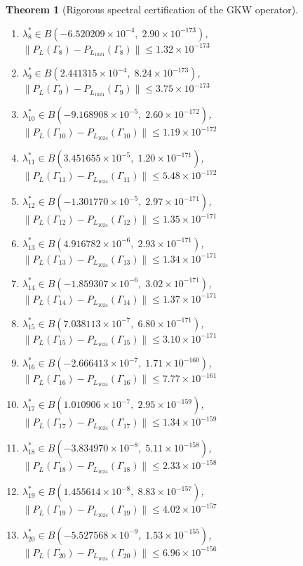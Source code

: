 \documentclass[11pt]{article}
\newtheorem{theorem}{Theorem}
\begin{document}
\begin{theorem}[Rigorous spectral certification of the GKW operator]
\begin{enumerate}
\item $\lambda_{8}^* \in B(-6.520209 \times 10^{-4},\; 2.90 \times 10^{-173})$, \quad $\|P_L(\Gamma_{8}) - P_{L_{1024}}(\Gamma_{8})\| \leq 1.32 \times 10^{-173}$
\item $\lambda_{9}^* \in B(2.441315 \times 10^{-4},\; 8.24 \times 10^{-173})$, \quad $\|P_L(\Gamma_{9}) - P_{L_{1024}}(\Gamma_{9})\| \leq 3.75 \times 10^{-173}$
\item $\lambda_{10}^* \in B(-9.168908 \times 10^{-5},\; 2.60 \times 10^{-172})$, \quad $\|P_L(\Gamma_{10}) - P_{L_{1024}}(\Gamma_{10})\| \leq 1.19 \times 10^{-172}$
\item $\lambda_{11}^* \in B(3.451655 \times 10^{-5},\; 1.20 \times 10^{-171})$, \quad $\|P_L(\Gamma_{11}) - P_{L_{1024}}(\Gamma_{11})\| \leq 5.48 \times 10^{-172}$
\item $\lambda_{12}^* \in B(-1.301770 \times 10^{-5},\; 2.97 \times 10^{-171})$, \quad $\|P_L(\Gamma_{12}) - P_{L_{1024}}(\Gamma_{12})\| \leq 1.35 \times 10^{-171}$
\item $\lambda_{13}^* \in B(4.916782 \times 10^{-6},\; 2.93 \times 10^{-171})$, \quad $\|P_L(\Gamma_{13}) - P_{L_{1024}}(\Gamma_{13})\| \leq 1.34 \times 10^{-171}$
\item $\lambda_{14}^* \in B(-1.859307 \times 10^{-6},\; 3.02 \times 10^{-171})$, \quad $\|P_L(\Gamma_{14}) - P_{L_{1024}}(\Gamma_{14})\| \leq 1.37 \times 10^{-171}$
\item $\lambda_{15}^* \in B(7.038113 \times 10^{-7},\; 6.80 \times 10^{-171})$, \quad $\|P_L(\Gamma_{15}) - P_{L_{1024}}(\Gamma_{15})\| \leq 3.10 \times 10^{-171}$
\item $\lambda_{16}^* \in B(-2.666413 \times 10^{-7},\; 1.71 \times 10^{-160})$, \quad $\|P_L(\Gamma_{16}) - P_{L_{1024}}(\Gamma_{16})\| \leq 7.77 \times 10^{-161}$
\item $\lambda_{17}^* \in B(1.010906 \times 10^{-7},\; 2.95 \times 10^{-159})$, \quad $\|P_L(\Gamma_{17}) - P_{L_{1024}}(\Gamma_{17})\| \leq 1.34 \times 10^{-159}$
\item $\lambda_{18}^* \in B(-3.834970 \times 10^{-8},\; 5.11 \times 10^{-158})$, \quad $\|P_L(\Gamma_{18}) - P_{L_{1024}}(\Gamma_{18})\| \leq 2.33 \times 10^{-158}$
\item $\lambda_{19}^* \in B(1.455614 \times 10^{-8},\; 8.83 \times 10^{-157})$, \quad $\|P_L(\Gamma_{19}) - P_{L_{1024}}(\Gamma_{19})\| \leq 4.02 \times 10^{-157}$
\item $\lambda_{20}^* \in B(-5.527568 \times 10^{-9},\; 1.53 \times 10^{-155})$, \quad $\|P_L(\Gamma_{20}) - P_{L_{1024}}(\Gamma_{20})\| \leq 6.96 \times 10^{-156}$

\end{enumerate}
\end{theorem}
\end{document}
